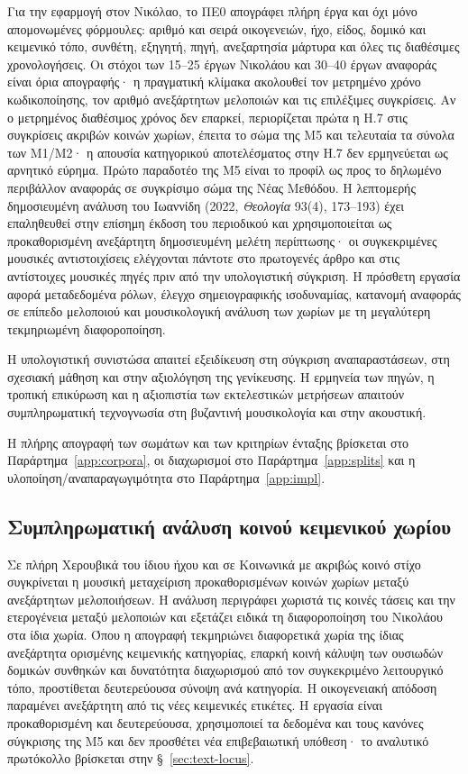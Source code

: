 \documentclass[11pt,a4paper]{article}
\begin{document}
Για την εφαρμογή στον Νικόλαο, το ΠΕ0 απογράφει πλήρη έργα και όχι μόνο απομονωμένες φόρμουλες: αριθμό και σειρά οικογενειών, ήχο, είδος, δομικό και κειμενικό τόπο, συνθέτη, εξηγητή, πηγή, ανεξαρτησία μάρτυρα και όλες τις διαθέσιμες χρονολογήσεις. Οι στόχοι των 15--25 έργων Νικολάου και 30--40 έργων αναφοράς είναι όρια απογραφής· η πραγματική κλίμακα ακολουθεί τον μετρημένο χρόνο κωδικοποίησης, τον αριθμό ανεξάρτητων μελοποιών και τις επιλέξιμες συγκρίσεις. Αν ο μετρημένος διαθέσιμος χρόνος δεν επαρκεί, περιορίζεται πρώτα η H.7 στις συγκρίσεις ακριβών κοινών χωρίων, έπειτα το σώμα της M5 και τελευταία τα σύνολα των M1/M2· η απουσία κατηγορικού αποτελέσματος στην H.7 δεν ερμηνεύεται ως αρνητικό εύρημα. Πρώτο παραδοτέο της M5 είναι το προφίλ ως προς το δηλωμένο περιβάλλον αναφοράς σε συγκρίσιμο σώμα της Νέας Μεθόδου. Η λεπτομερής δημοσιευμένη ανάλυση του Ιωαννίδη (2022, \emph{Θεολογία} 93(4), 173--193) έχει επαληθευθεί στην επίσημη έκδοση του περιοδικού και χρησιμοποιείται ως προκαθορισμένη ανεξάρτητη δημοσιευμένη μελέτη περίπτωσης· οι συγκεκριμένες μουσικές αντιστοιχίσεις ελέγχονται πάντοτε στο πρωτογενές άρθρο και στις αντίστοιχες μουσικές πηγές πριν από την υπολογιστική σύγκριση. Η πρόσθετη εργασία αφορά μεταδεδομένα ρόλων, έλεγχο σημειογραφικής ισοδυναμίας, κατανομή αναφοράς σε επίπεδο μελοποιού και μουσικολογική ανάλυση των χωρίων με τη μεγαλύτερη τεκμηριωμένη διαφοροποίηση.

Η υπολογιστική συνιστώσα απαιτεί εξειδίκευση στη σύγκριση αναπαραστάσεων, στη σχεσιακή μάθηση και στην αξιολόγηση της γενίκευσης. Η ερμηνεία των πηγών, η τροπική επικύρωση και η αξιοπιστία των εκτελεστικών μετρήσεων απαιτούν συμπληρωματική τεχνογνωσία στη βυζαντινή μουσικολογία και στην ακουστική.

Η πλήρης απογραφή των σωμάτων και των κριτηρίων ένταξης βρίσκεται στο Παράρτημα~\ref{app:corpora}, οι διαχωρισμοί στο Παράρτημα~\ref{app:splits} και η υλοποίηση/αναπαραγωγιμότητα στο Παράρτημα~\ref{app:impl}.

\subsection{Συμπληρωματική ανάλυση κοινού κειμενικού χωρίου}

Σε πλήρη Χερουβικά του ίδιου ήχου και σε Κοινωνικά με ακριβώς κοινό στίχο συγκρίνεται η μουσική μεταχείριση προκαθορισμένων κοινών χωρίων μεταξύ ανεξάρτητων μελοποιήσεων. Η ανάλυση περιγράφει χωριστά τις κοινές τάσεις και την ετερογένεια μεταξύ μελοποιών και εξετάζει ειδικά τη διαφοροποίηση του Νικολάου στα ίδια χωρία. Όπου η απογραφή τεκμηριώνει διαφορετικά χωρία της ίδιας ανεξάρτητα ορισμένης κειμενικής κατηγορίας, επαρκή κοινή κάλυψη των ουσιωδών δομικών συνθηκών και δυνατότητα διαχωρισμού από τον συγκεκριμένο λειτουργικό τόπο, προστίθεται δευτερεύουσα σύνοψη ανά κατηγορία. Η οικογενειακή απόδοση παραμένει ανεξάρτητη από τις νέες κειμενικές ετικέτες. Η εργασία είναι προκαθορισμένη και δευτερεύουσα, χρησιμοποιεί τα δεδομένα και τους κανόνες σύγκρισης της M5 και δεν προσθέτει νέα επιβεβαιωτική υπόθεση· το αναλυτικό πρωτόκολλο βρίσκεται στην §~\ref{sec:text-locus}.
\end{document}
